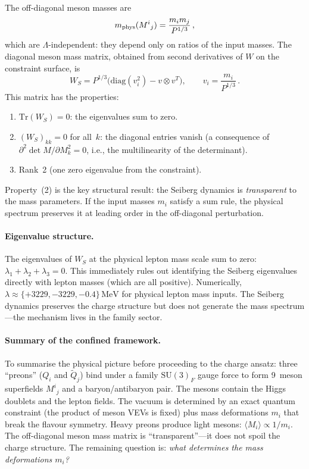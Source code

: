 \documentclass[12pt,a4paper]{article}
\makeatletter
\newcommand{\SU}{\mathrm{SU}}
\newcommand{\Tr}{\mathrm{Tr}}
\newcommand{\diag}{\mathrm{diag}}
\newcommand{\MeV}{\,\mathrm{MeV}}
\newcommand{\ie}{i.e.\@}
\makeatother
\begin{document}
The off-diagonal meson masses are
\begin{equation}
  m_{\rm phys}(M^i{}_j) = \frac{m_i m_j}{P^{1/3}}\,,
  \label{eq:offdiag}
\end{equation}
which are $\Lambda$-independent: they depend only on ratios of the
input masses. The diagonal meson mass matrix, obtained from second
derivatives of $W$ on the constraint surface, is
\begin{equation}
  W_S = P^{1/3}\bigl(\diag(v_i^2) - v \otimes v^T\bigr),
  \qquad v_i = \frac{m_i}{P^{1/3}}\,.
  \label{eq:WS}
\end{equation}
This matrix has the properties:
\begin{enumerate}
  \item $\Tr(W_S) = 0$: the eigenvalues sum to zero.
  \item $(W_S)_{kk} = 0$ for all~$k$: the diagonal entries vanish
    (a consequence of $\partial^2 \det M / \partial M_k^2 = 0$, \ie,
    the multilinearity of the determinant).
  \item Rank~2 (one zero eigenvalue from the constraint).
\end{enumerate}
Property~(2) is the key structural result: the Seiberg dynamics is
\emph{transparent} to the mass parameters. If the input masses $m_i$
satisfy a sum rule, the physical spectrum preserves it at leading order
in the off-diagonal perturbation.

\paragraph{Eigenvalue structure.}
The eigenvalues of $W_S$ at the physical lepton mass scale
sum to zero: $\lambda_1 + \lambda_2 +
\lambda_3 = 0$. This immediately rules out identifying the Seiberg
eigenvalues directly with lepton masses (which are all positive).
Numerically, $\lambda \approx \{+3229, -3229, -0.4\}\MeV$ for
physical lepton mass inputs. The Seiberg dynamics preserves the charge
structure but does not generate the mass spectrum---the mechanism lives
in the family sector.

\paragraph{Summary of the confined framework.}
To summarise the physical picture before proceeding to the charge
ansatz: three ``preons'' ($Q_i$ and $\tilde Q_j$) bind under
a family $\SU(3)_F$ gauge force to form 9~meson superfields
$M^i{}_j$ and a baryon/antibaryon pair. The mesons contain the
Higgs doublets and the lepton fields. The vacuum is determined by
an exact quantum constraint (the product of meson VEVs is fixed)
plus mass deformations $m_i$ that break the flavour symmetry.
Heavy preons produce light mesons: $\langle M_i\rangle \propto
1/m_i$. The off-diagonal meson mass matrix is ``transparent''---it
does not spoil the charge structure. The remaining question is:
\emph{what determines the mass deformations $m_i$?}
\end{document}
